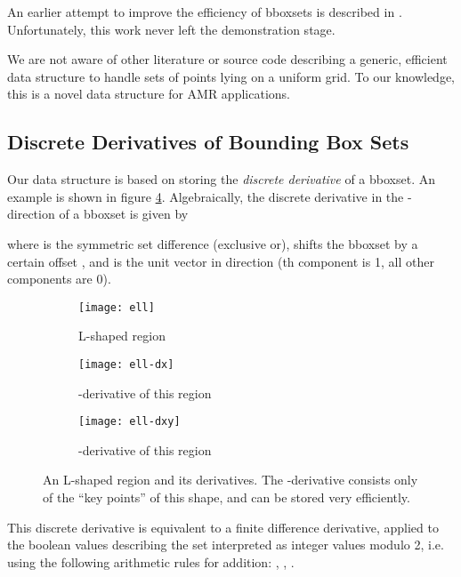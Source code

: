 \documentclass[conference]{IEEEtran}
\begin{document}
An earlier attempt to improve the efficiency of bboxsets is
described in \cite{Zebrowski:2011bl}. Unfortunately, this work never
left the demonstration stage.

We are not aware of other literature or source code describing a generic,
efficient data structure to handle sets of points lying on a uniform
grid. To our knowledge, this is a novel data structure for AMR
applications.

\subsection{Discrete Derivatives of Bounding Box Sets}

Our data structure is based on storing the \emph{discrete derivative}
of a bboxset. An example is shown in figure \ref{fig:derivatives}.
Algebraically, the discrete derivative in the -direction of a
bboxset  is given by

where  is the symmetric set difference (exclusive or),
 shifts the bboxset  by a certain offset ,
and  is the unit vector in direction  (th component is 1,
all other components are 0).

\begin{figure}
  \centering
  \begin{subfigure}[t]{0.27\linewidth}
    \centering
    \texttt{[image: ell]}
    \caption{L-shaped region}
    \label{fig:ell}
  \end{subfigure}
  \hfill
  \begin{subfigure}[t]{0.27\linewidth}
    \centering
    \texttt{[image: ell-dx]}
    \caption{-derivative of this region}
    \label{fig:ell-dx}
  \end{subfigure}
  \hfill
  \begin{subfigure}[t]{0.27\linewidth}
    \centering
    \texttt{[image: ell-dxy]}
    \caption{-derivative of this region}
    \label{fig:ell-dxy}
  \end{subfigure}
  \caption{An L-shaped region and its derivatives. The -derivative
    consists only of the ``key points'' of this shape, and can be
    stored very efficiently.}
  \label{fig:derivatives}
\end{figure}

This discrete derivative is equivalent to a finite difference
derivative, applied to the boolean values describing the set
interpreted as integer values modulo 2, i.e. using the
following arithmetic rules for addition: , , .
\end{document}
